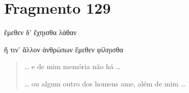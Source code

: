 





\pagebreak
\section{Fragmento 129}

\begin{gkverse}
ἔμεθεν δ’ ἔχηισθα λάθαν

\hspace*{17mm}

ἤ τιν’ ἄλλον ἀνθρώπων ἔμεθεν φίληισθα

\end{gkverse}

\begin{verse}
\ldots{} e de mim memória não há \ldots{}

\hspace*{17mm}

\ldots{} ou algum outro dos homens ame, além de mim \ldots{}
\end{verse}

